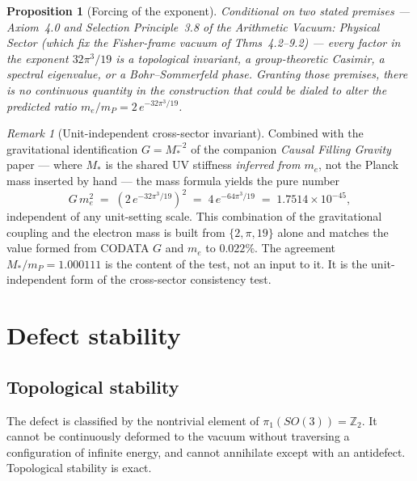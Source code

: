 \documentclass[12pt]{article}
\newtheorem{proposition}[theorem]{Proposition}
\theoremstyle{definition}
\theoremstyle{remark}
\newtheorem{remark}[theorem]{Remark}
\begin{document}
\begin{proposition}[Forcing of the exponent]
\label{prop:expforced}
Conditional on two stated premises --- Axiom~4.0 and Selection
Principle~3.8 of the \emph{Arithmetic Vacuum: Physical Sector}
(which fix the Fisher-frame vacuum of Thms~4.2--9.2) --- every factor
in the exponent $32\pi^3/19$ is a topological invariant, a
group-theoretic Casimir, a spectral eigenvalue, or a Bohr--Sommerfeld
phase. Granting those premises, there is no continuous quantity in the
construction that could be dialed to alter the predicted ratio
$m_e/m_P=2\,e^{-32\pi^3/19}$.
\end{proposition}

\begin{remark}[Unit-independent cross-sector invariant]
\label{rem:Gme2}
Combined with the gravitational identification $G=M_*^{-2}$ of the companion
\emph{Causal Filling Gravity} paper --- where $M_*$ is the shared UV stiffness
\emph{inferred from $m_e$}, not the Planck mass inserted by hand --- the mass
formula yields the pure number
\begin{equation}
G\,m_e^2\;=\;\left(2\,e^{-32\pi^3/19}\right)^2\;=\;4\,e^{-64\pi^3/19}
\;=\;1.7514\times10^{-45},
\label{eq:Gme2}
\end{equation}
independent of any unit-setting scale. This combination of the gravitational
coupling and the electron mass is built from $\{2,\pi,19\}$ alone and matches
the value formed from CODATA $G$ and $m_e$ to $0.022\%$. The agreement
$M_*/m_P=1.000111$ is the content of the test, not an input to it. It is the
unit-independent form of the cross-sector consistency test.
\end{remark}

\section{Defect stability}
\label{sec:stability}

\subsection{Topological stability}

The defect is classified by the nontrivial element of
$\pi_1(SO(3))=\mathbb{Z}_2$.  It cannot be continuously deformed to the
vacuum without traversing a configuration of infinite energy, and cannot
annihilate except with an antidefect.  Topological stability is exact.
\end{document}
